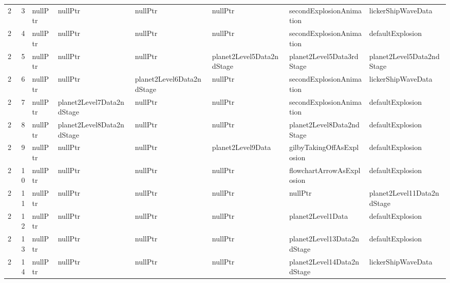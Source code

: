 \begin{tabular}{rrllllll}
      2 &       3 & nullPtr                  & nullPtr                      & nullPtr                      & nullPtr                   & secondExplosionAnimation   & lickerShipWaveData         \\
      2 &       4 & nullPtr                  & nullPtr                      & nullPtr                      & nullPtr                   & secondExplosionAnimation   & defaultExplosion           \\
      2 &       5 & nullPtr                  & nullPtr                      & nullPtr                      & planet2Level5Data2ndStage & planet2Level5Data3rdStage  & planet2Level5Data2ndStage  \\
      2 &       6 & nullPtr                  & nullPtr                      & planet2Level6Data2ndStage    & nullPtr                   & secondExplosionAnimation   & lickerShipWaveData         \\
      2 &       7 & nullPtr                  & planet2Level7Data2ndStage    & nullPtr                      & nullPtr                   & secondExplosionAnimation   & defaultExplosion           \\
      2 &       8 & nullPtr                  & planet2Level8Data2ndStage    & nullPtr                      & nullPtr                   & planet2Level8Data2ndStage  & defaultExplosion           \\
      2 &       9 & nullPtr                  & nullPtr                      & nullPtr                      & planet2Level9Data         & gilbyTakingOffAsExplosion  & defaultExplosion           \\
      2 &      10 & nullPtr                  & nullPtr                      & nullPtr                      & nullPtr                   & flowchartArrowAsExplosion  & defaultExplosion           \\
      2 &      11 & nullPtr                  & nullPtr                      & nullPtr                      & nullPtr                   & nullPtr                    & planet2Level11Data2ndStage \\
      2 &      12 & nullPtr                  & nullPtr                      & nullPtr                      & nullPtr                   & planet2Level1Data          & defaultExplosion           \\
      2 &      13 & nullPtr                  & nullPtr                      & nullPtr                      & nullPtr                   & planet2Level13Data2ndStage & defaultExplosion           \\
      2 &      14 & nullPtr                  & nullPtr                      & nullPtr                      & nullPtr                   & planet2Level14Data2ndStage & lickerShipWaveData         \\

\end{tabular}
